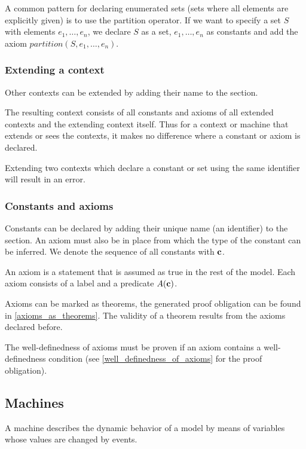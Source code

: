 A common pattern for declaring enumerated sets (sets where all elements are explicitly given)
is to use the partition operator. If we want to specify a set $S$ with elements $e_1,\ldots,e_n$,
we declare $S$ as a set, $e_1,\ldots,e_n$ as constants and add the axiom $partition(S,e_1,\ldots,e_n)$.

\subsubsection{Extending a context}
\label{extendind_a_context}
Other contexts can be extended by adding their name to the  section.

The resulting context consists of all constants and axioms of all extended contexts and the extending context itself.
Thus for a context or machine that extends or sees the contexts, it makes no difference where a constant or axiom is declared.

Extending two contexts which declare a constant or set using the same identifier will result in an error.

\subsubsection{Constants and axioms}
\label{constants_and_axioms}
Constants can be declared by adding their unique name (an identifier) to the  section.
An axiom must also be in place from which the type of the constant can be inferred.
We denote the sequence of all constants with $\mathbf{c}$.

An axiom is a statement that is assumed as true in the rest of the model.
Each axiom consists of a label and a predicate $A(\mathbf{c})$.


Axioms can be marked as theorems,
  the generated proof obligation can be found in \ref{axioms_as_theorems}.
The validity of a theorem results from the axioms declared before.

The well-definedness of axioms must be proven if an axiom contains a well-definedness condition
  (see \ref{well_definedness_of_axioms} for the proof obligation).

\subsection{Machines}
\label{machine}

A machine describes the dynamic behavior of a model by means of variables whose values are changed by events.

